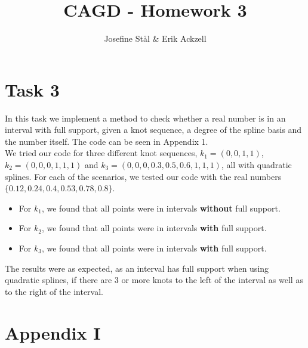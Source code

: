 \documentclass[]{article}
\title{CAGD - Homework 3}
\author{Josefine St{\aa}l \& Erik Ackzell}
\begin{document}
\maketitle
\section*{Task 3}
In this task we implement a method to check whether a real number is in an interval with full support, given a knot sequence, a degree of the spline basis and the number itself. The code can be seen in Appendix 1. \\
We tried our code for three different knot sequences, $k_1=(0, 0, 1, 1)$, $k_2=(0, 0, 0, 1, 1, 1)$ and $k_3=(0, 0, 0, 0.3, 0.5, 0.6, 1, 1, 1)$, all with quadratic splines. For each of the scenarios, we tested our code with the real numbers $\{0.12, 0.24, 0.4, 0.53, 0.78, 0.8\}$.
\begin{itemize}
	\item For $k_1$, we found that all points were in intervals \textbf{without} full support.
	\item For $k_2$, we found that all points were in intervals \textbf{with} full support.
	\item For $k_3$, we found that all points were in intervals \textbf{with} full support.
\end{itemize}
The results were as expected, as an interval has full support when using quadratic splines, if there are 3 or more knots to the left of the interval as well as to the right of the interval.



\newpage
\section*{Appendix I}
%
\end{document}
